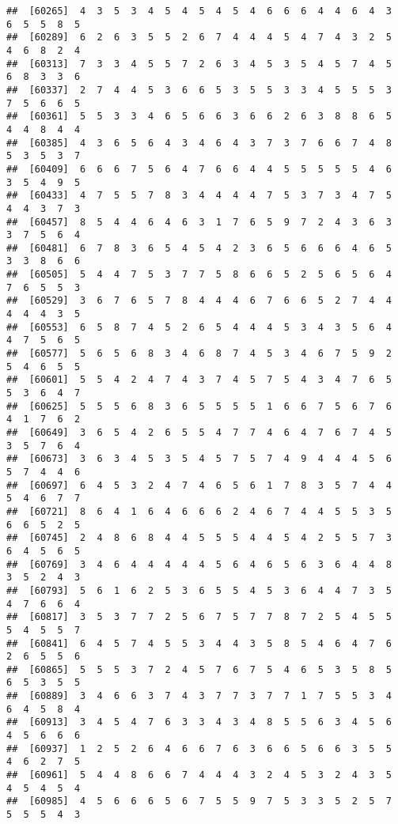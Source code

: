 \documentclass[
]{book}
\begin{document}
\begin{verbatim}
##  [60265]  4  3  5  3  4  5  4  5  4  5  4  6  6  6  4  4  6  4  3  6  5  5  8  5
##  [60289]  6  2  6  3  5  5  2  6  7  4  4  4  5  4  7  4  3  2  5  4  6  8  2  4
##  [60313]  7  3  3  4  5  5  7  2  6  3  4  5  3  5  4  5  7  4  5  6  8  3  3  6
##  [60337]  2  7  4  4  5  3  6  6  5  3  5  5  3  3  4  5  5  5  3  7  5  6  6  5
##  [60361]  5  5  3  3  4  6  5  6  6  3  6  6  2  6  3  8  8  6  5  4  4  8  4  4
##  [60385]  4  3  6  5  6  4  3  4  6  4  3  7  3  7  6  6  7  4  8  5  3  5  3  7
##  [60409]  6  6  6  7  5  6  4  7  6  6  4  4  5  5  5  5  5  4  6  3  5  4  9  5
##  [60433]  4  7  5  5  7  8  3  4  4  4  4  7  5  3  7  3  4  7  5  4  4  3  7  3
##  [60457]  8  5  4  4  6  4  6  3  1  7  6  5  9  7  2  4  3  6  3  3  7  5  6  4
##  [60481]  6  7  8  3  6  5  4  5  4  2  3  6  5  6  6  6  4  6  5  3  3  8  6  6
##  [60505]  5  4  4  7  5  3  7  7  5  8  6  6  5  2  5  6  5  6  4  7  6  5  5  3
##  [60529]  3  6  7  6  5  7  8  4  4  4  6  7  6  6  5  2  7  4  4  4  4  4  3  5
##  [60553]  6  5  8  7  4  5  2  6  5  4  4  4  5  3  4  3  5  6  4  4  7  5  6  5
##  [60577]  5  6  5  6  8  3  4  6  8  7  4  5  3  4  6  7  5  9  2  5  4  6  5  5
##  [60601]  5  5  4  2  4  7  4  3  7  4  5  7  5  4  3  4  7  6  5  5  3  6  4  7
##  [60625]  5  5  5  6  8  3  6  5  5  5  5  1  6  6  7  5  6  7  6  4  1  7  6  2
##  [60649]  3  6  5  4  2  6  5  5  4  7  7  4  6  4  7  6  7  4  5  3  5  7  6  4
##  [60673]  3  6  3  4  5  3  5  4  5  7  5  7  4  9  4  4  4  5  6  5  7  4  4  6
##  [60697]  6  4  5  3  2  4  7  4  6  5  6  1  7  8  3  5  7  4  4  5  4  6  7  7
##  [60721]  8  6  4  1  6  4  6  6  6  2  4  6  7  4  4  5  5  3  5  6  6  5  2  5
##  [60745]  2  4  8  6  8  4  4  5  5  5  4  4  5  4  2  5  5  7  3  6  4  5  6  5
##  [60769]  3  4  6  4  4  4  4  4  5  6  4  6  5  6  3  6  4  4  8  3  5  2  4  3
##  [60793]  5  6  1  6  2  5  3  6  5  5  4  5  3  6  4  4  7  3  5  4  7  6  6  4
##  [60817]  3  5  3  7  7  2  5  6  7  5  7  7  8  7  2  5  4  5  5  5  4  5  5  7
##  [60841]  6  4  5  7  4  5  5  3  4  4  3  5  8  5  4  6  4  7  6  2  6  5  5  6
##  [60865]  5  5  5  3  7  2  4  5  7  6  7  5  4  6  5  3  5  8  5  6  5  3  5  5
##  [60889]  3  4  6  6  3  7  4  3  7  7  3  7  7  1  7  5  5  3  4  6  4  5  8  4
##  [60913]  3  4  5  4  7  6  3  3  4  3  4  8  5  5  6  3  4  5  6  4  5  6  6  6
##  [60937]  1  2  5  2  6  4  6  6  7  6  3  6  6  5  6  6  3  5  5  4  6  2  7  5
##  [60961]  5  4  4  8  6  6  7  4  4  4  3  2  4  5  3  2  4  3  5  4  5  4  5  4
##  [60985]  4  5  6  6  6  5  6  7  5  5  9  7  5  3  3  5  2  5  7  5  5  5  4  3

\end{verbatim}
\end{document}
